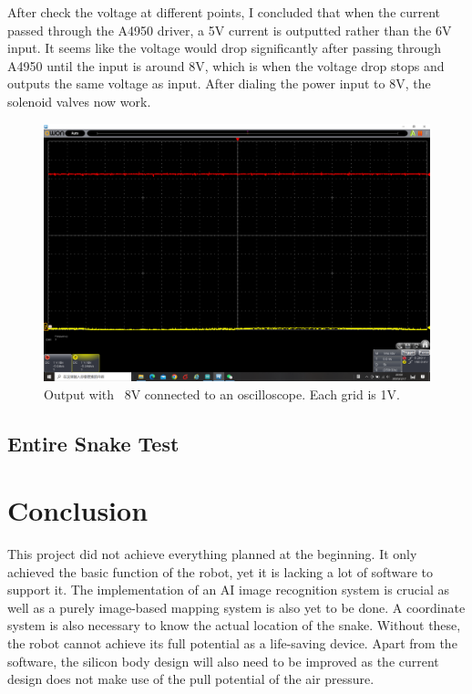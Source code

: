\documentclass[twoside]{article}
\begin{document}
After check the voltage at different points, I concluded that when the current passed through the A4950 driver, a 5V current is outputted rather than the 6V input. It seems like the voltage would drop significantly after passing through A4950 until the input is around 8V, which is when the voltage drop stops and outputs the same voltage as input. After dialing the power input to 8V, the solenoid valves now work.

\begin{figure} [H]
\centering
\includegraphics[width=\textwidth]{Oscilloscope}
\caption{Output with ~8V connected to an oscilloscope. Each grid is 1V.}
\end{figure}

\subsection{Entire Snake Test}

\blindtext


\section{Conclusion}
This project did not achieve everything planned at the beginning. It only achieved the basic function of the robot, yet it is lacking a lot of software to support it. The implementation of an AI image recognition system is crucial as well as a purely image-based mapping system is also yet to be done. A coordinate system is also necessary to know the actual location of the snake. Without these, the robot cannot achieve its full potential as a life-saving device. Apart from the software, the silicon body design will also need to be improved as the current design does not make use of the pull potential of the air pressure.
\end{document}
